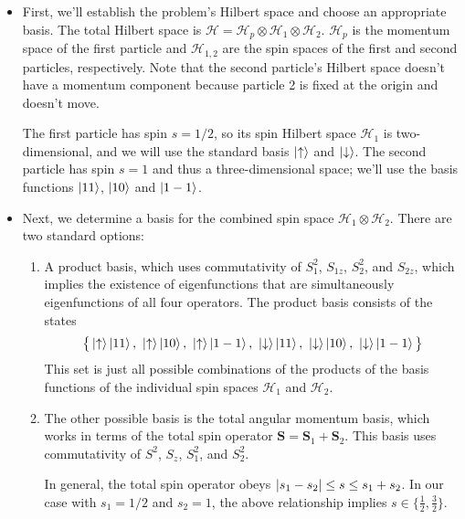 \documentclass[11pt, a4paper]{article}
\renewcommand{\vec}[1]{\bm{#1}} %
\renewcommand{\H}{\mathcal{H}}  %
\newcommand{\ua}{\uparrow}  %
\newcommand{\da}{\downarrow}  %
\begin{document}
\begin{itemize}
	\item First, we'll establish the problem's Hilbert space and choose an appropriate basis. The total Hilbert space is $ \H = \H_{p} \otimes \H_{1} \otimes \H_{2} $. $ \H_{p} $ is the momentum space of the first particle and $ \H_{1,2} $  are the spin spaces of the first and second particles, respectively. Note that the second particle's Hilbert space doesn't have a momentum component because particle 2 is fixed at the origin and doesn't move.
	
	The first particle has spin $ s = 1/2 $, so its spin Hilbert space $ \H_{1} $ is two-dimensional, and we will use the standard basis $ \ket{\ua} $ and $ \ket{\da} $. The second particle has spin $ s = 1 $ and thus a three-dimensional space; we'll use the basis functions $ \ket{11} $, $ \ket{10} $ and $ \ket{1-1} $.
	
	\item Next, we determine a basis for the combined spin space $ \H_{1} \otimes \H_{2} $. There are two standard options:
	\begin{enumerate}
		\item A product basis, which uses commutativity of $ S_{1}^{2} $, $ S_{1z} $, $ S_{2}^{2} $, and $ S_{2z} $, which implies the existence of eigenfunctions that are simultaneously eigenfunctions of all four operators. The product basis consists of the states 
		\begin{equation*}
			\big\{\ket{\ua}\ket{11},\ \ket{\ua}\ket{10},\ \ket{\ua}\ket{1-1},\ \ket{\da}\ket{11},\ \ket{\da}\ket{10},\ \ket{\da}\ket{1-1}   \big\}
		\end{equation*}
		This set is just all possible combinations of the products of the basis functions of the individual spin spaces $ \H_{1} $ and $ \H_{2} $.
		
		\item The other possible basis is the total angular momentum basis, which works in terms of the total spin operator $ \vec{S} = \vec{S}_{1} + \vec{S}_{2} $. This basis uses commutativity of $ S^{2} $, $ S_{z} $, $ S_{1}^{2} $, and $ S_{2}^{2} $.
			
		In general, the total spin operator obeys $ \abs{s_{1} - s_{2}} \leq s \leq s_{1} + s_{2} $. In our case with $ s_{1} = 1/2 $  and $ s_{2} = 1 $, the above relationship implies $ s \in \big\{ \frac{1}{2}, \frac{3}{2} \big\} $.
			

\end{enumerate}
\end{itemize}
\end{document}
